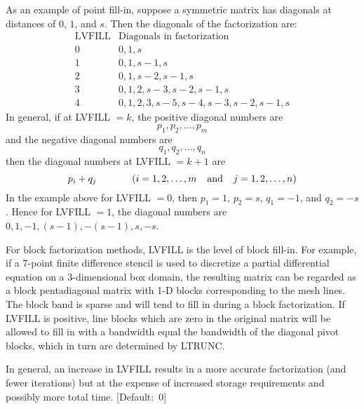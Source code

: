 \begin{list}{}{
               \leftmargin 1.00in \rightmargin 0.25in}
         As an example of point fill-in, suppose a symmetric
         matrix has diagonals at distances of $0$, $1$, and $s$.
         Then the diagonals of the factorization are:
         \[
         \begin{array}{cl}
          \mbox{LVFILL} & \mbox{Diagonals in factorization} \\
            0 & 0,1,s                           \\
            1 & 0,1,s-1,s                       \\
            2 & 0,1,s-2,s-1,s                   \\
            3 & 0,1,2,s-3,s-2,s-1,s             \\
            4 & 0,1,2,3,s-5,s-4,s-3,s-2,s-1,s
         \end{array}
         \]
         In general, if at LVFILL $= k$, the positive diagonal numbers
         are
         \[
              p_1,p_2, \ldots ,p_m
         \]
         and the negative diagonal numbers are
         \[
              q_1,q_2, \ldots ,q_n
         \]
         then the diagonal numbers at LVFILL $= k+1$ are
         \[
              p_i + q_j  \hspace*{0.5in} (i=1,2, \ldots ,m
                   \mbox{\hspace*{0.1in} and \hspace*{0.1in}}
                             j=1,2, \ldots ,n)
         \]
         In the example above for LVFILL $=0$, then $p_1=1$, 
         $p_2=s$, $q_1=-1$, and $q_2=-s$.  Hence for LVFILL $=1$,
         the diagonal numbers are $0,1,-1,(s-1),-(s-1),s,-s$.
 
         For block factorization methods, LVFILL is the level of
         block fill-in.  For example, if a 7-point finite difference
         stencil is used to discretize a partial differential equation
         on a 3-dimensional box domain, the resulting matrix can be
         regarded as a block pentadiagonal matrix with 1-D blocks
         corresponding to the mesh lines.  The block band is sparse
         and will tend to fill in during a block factorization.  If
         LVFILL is positive, line blocks which are zero in the original
         matrix will be allowed to fill in with a bandwidth equal
         the bandwidth of the diagonal pivot blocks, which in turn
         are determined by LTRUNC.
 
         In general, an increase in LVFILL results in a more accurate
         factorization (and fewer iterations) but at the expense of
         increased storage requirements and possibly more total time.
         \mbox{[Default: $0$]}
 

\end{list}
